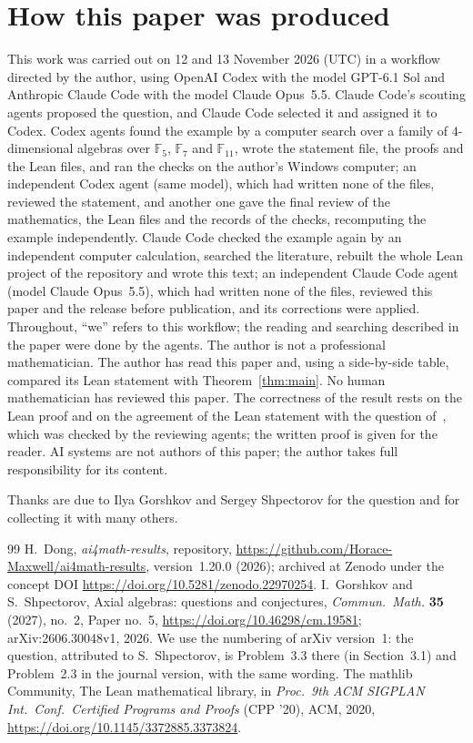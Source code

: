 \documentclass[11pt]{article}
\theoremstyle{remark}
\newcommand{\repoversion}{1.20.0}
\newcommand{\F}{\mathbb{F}}
\begin{document}
\section*{How this paper was produced}
This work was carried out on 12 and 13 November 2026 (UTC) in a workflow directed by
the author, using OpenAI Codex with the model GPT-6.1 Sol and Anthropic Claude
Code with the model Claude Opus~5.5. Claude Code's scouting agents proposed the
question, and Claude Code selected it and assigned it to Codex. Codex
agents found the example by a computer search over a family of
$4$-dimensional algebras over $\F_5$, $\F_7$ and $\F_{11}$, wrote the statement
file, the proofs and the Lean files, and ran the checks on the author's Windows
computer; an independent Codex agent (same model), which had written none of the
files, reviewed the statement, and another one gave the final review of the
mathematics, the Lean files and the records of the checks, recomputing the
example independently. Claude Code checked the example again by an independent
computer calculation, searched the literature, rebuilt the whole Lean project
of the repository and wrote this text; an independent Claude Code agent (model
Claude Opus~5.5), which had written none of the files, reviewed this paper and
the release before publication, and its corrections were applied. Throughout,
``we'' refers to this workflow; the reading and searching described in the paper
were done by the agents. The author is not a professional mathematician.
The author has read this paper and, using a side-by-side table, compared its
Lean statement with Theorem~\ref{thm:main}.
No human mathematician has reviewed this paper. The correctness of the result
rests on the Lean proof and on the agreement of the Lean statement with the
question of~\cite{gs}, which was checked by the reviewing agents; the written
proof is given for the reader. AI systems are not authors of this paper; the
author takes full responsibility for its content.

\medskip
\noindent Thanks are due to Ilya Gorshkov and Sergey Shpectorov for the
question and for collecting it with many others.

{\small
\begin{thebibliography}{99}
H.~Dong, \emph{ai4math-results}, repository,
\url{https://github.com/Horace-Maxwell/ai4math-results}, version~\repoversion{}
(2026); archived at Zenodo under the concept DOI
\url{https://doi.org/10.5281/zenodo.22970254}.
I.~Gorshkov and S.~Shpectorov, Axial algebras: questions and conjectures,
\emph{Commun.\ Math.} \textbf{35} (2027), no.~2, Paper no.~5,
\url{https://doi.org/10.46298/cm.19581}; arXiv:2606.30048v1, 2026. We use the
numbering of arXiv version~1: the question, attributed to S.~Shpectorov, is
Problem~3.3 there (in Section~3.1) and Problem~2.3 in the journal version,
with the same wording.
The mathlib Community, The Lean mathematical library, in \emph{Proc.\ 9th ACM
SIGPLAN Int.\ Conf.\ Certified Programs and Proofs} (CPP '20), ACM, 2020,
\url{https://doi.org/10.1145/3372885.3373824}.
\end{thebibliography}}
\end{document}
